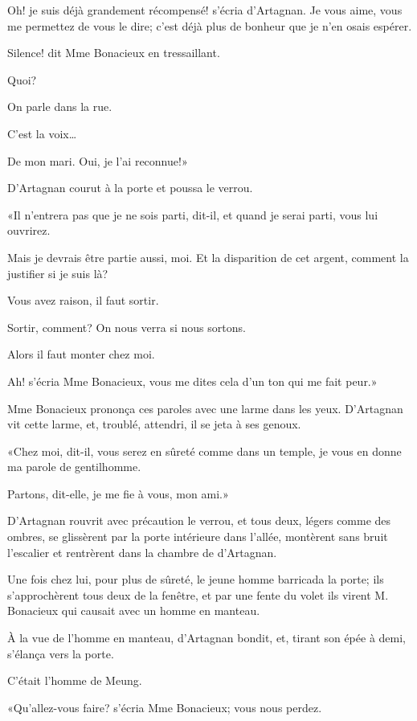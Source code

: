 \speak  Oh! je suis déjà grandement récompensé! s'écria d'Artagnan. Je vous aime, vous me permettez de vous le dire; c'est déjà plus de bonheur que je n'en osais espérer. 

\speak  Silence! dit Mme Bonacieux en tressaillant. 

\speak  Quoi? 

\speak  On parle dans la rue. 

\speak  C'est la voix\dots 

\speak  De mon mari. Oui, je l'ai reconnue!» 

D'Artagnan courut à la porte et poussa le verrou. 

«Il n'entrera pas que je ne sois parti, dit-il, et quand je serai parti, vous lui ouvrirez. 

\speak  Mais je devrais être partie aussi, moi. Et la disparition de cet argent, comment la justifier si je suis là? 

\speak  Vous avez raison, il faut sortir. 

\speak  Sortir, comment? On nous verra si nous sortons. 

\speak  Alors il faut monter chez moi. 

\speak  Ah! s'écria Mme Bonacieux, vous me dites cela d'un ton qui me fait peur.» 

Mme Bonacieux prononça ces paroles avec une larme dans les yeux. D'Artagnan vit cette larme, et, troublé, attendri, il se jeta à ses genoux. 

«Chez moi, dit-il, vous serez en sûreté comme dans un temple, je vous en donne ma parole de gentilhomme. 

\speak  Partons, dit-elle, je me fie à vous, mon ami.» 

D'Artagnan rouvrit avec précaution le verrou, et tous deux, légers comme des ombres, se glissèrent par la porte intérieure dans l'allée, montèrent sans bruit l'escalier et rentrèrent dans la chambre de d'Artagnan. 

Une fois chez lui, pour plus de sûreté, le jeune homme barricada la porte; ils s'approchèrent tous deux de la fenêtre, et par une fente du volet ils virent M. Bonacieux qui causait avec un homme en manteau. 

À la vue de l'homme en manteau, d'Artagnan bondit, et, tirant son épée à demi, s'élança vers la porte. 

C'était l'homme de Meung. 

«Qu'allez-vous faire? s'écria Mme Bonacieux; vous nous perdez. 

